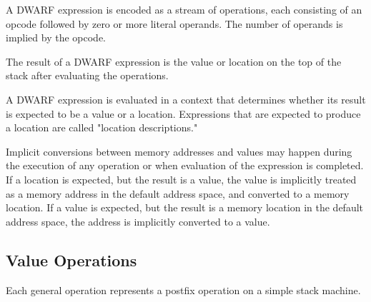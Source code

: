 A DWARF expression is encoded as a stream of operations, each
consisting of an opcode followed by zero or more literal operands. The
number of operands is implied by the opcode.

The result of a DWARF expression is the value or location on the top
of the stack after evaluating the operations.

A DWARF expression is evaluated in a context that determines whether
its result is expected to be a value or a location. Expressions that
are expected to produce a location are called "location descriptions."

Implicit conversions between memory addresses and values may happen
during the execution of any operation or when evaluation of the
expression is completed. If a location is expected, but the result is
a value, the value is implicitly treated as a memory address in the
default address space, and converted to a memory location. If a value
is expected, but the result is a memory location in the default
address space, the address is implicitly converted to a value.

\subsection{Value Operations}
\label{chap:valueoperations}
Each general operation represents a postfix operation on
a simple stack machine.

